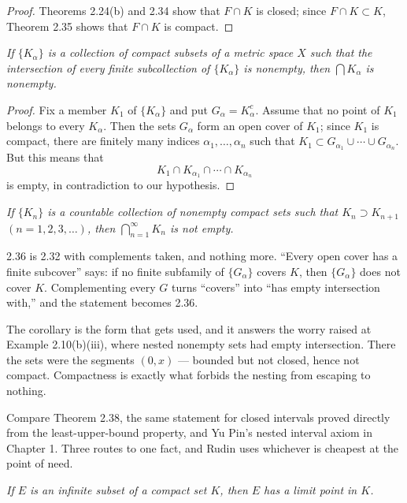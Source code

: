 \begin{proof}
Theorems 2.24(b) and 2.34 show that $F \cap K$ is closed; since
$F \cap K \subset K$, Theorem 2.35 shows that $F \cap K$ is compact.
\end{proof}

\emph{If $\{K_\alpha\}$ is a collection of compact subsets of a metric space
$X$ such that the intersection of every finite subcollection of $\{K_\alpha\}$
is nonempty, then $\bigcap K_\alpha$ is nonempty.}

\begin{proof}
Fix a member $K_1$ of $\{K_\alpha\}$ and put $G_\alpha = K_\alpha^c$. Assume
that no point of $K_1$ belongs to every $K_\alpha$. Then the sets $G_\alpha$
form an open cover of $K_1$; since $K_1$ is compact, there are finitely many
indices $\alpha_1,\dots,\alpha_n$ such that
$K_1 \subset G_{\alpha_1} \cup \cdots \cup G_{\alpha_n}$. But this means that
\[ K_1 \cap K_{\alpha_1} \cap \cdots \cap K_{\alpha_n} \]
is empty, in contradiction to our hypothesis.
\end{proof}

\emph{If $\{K_n\}$ is a countable collection of nonempty compact sets such that
$K_n \supset K_{n+1}$ $(n = 1,2,3,\dots)$, then $\bigcap_{n=1}^\infty K_n$ is
not empty.}

\begin{deeper}
2.36 is 2.32 with complements taken, and nothing more. ``Every open cover has a
finite subcover'' says: if no finite subfamily of $\{G_\alpha\}$ covers $K$,
then $\{G_\alpha\}$ does not cover $K$. Complementing every $G$ turns
``covers'' into ``has empty intersection with,'' and the statement becomes
2.36.

The corollary is the form that gets used, and it answers the worry raised at
Example 2.10(b)(iii), where nested nonempty sets had empty intersection. There
the sets were the segments $(0,x)$ --- bounded but not closed, hence not
compact. Compactness is exactly what forbids the nesting from escaping to
nothing.

Compare Theorem 2.38, the same statement for closed intervals proved directly
from the least-upper-bound property, and Yu Pin's nested interval axiom in
Chapter 1. Three routes to one fact, and Rudin uses whichever is cheapest at
the point of need.
\end{deeper}

\emph{If $E$ is an infinite subset of a compact set $K$, then $E$ has a limit
point in $K$.}

